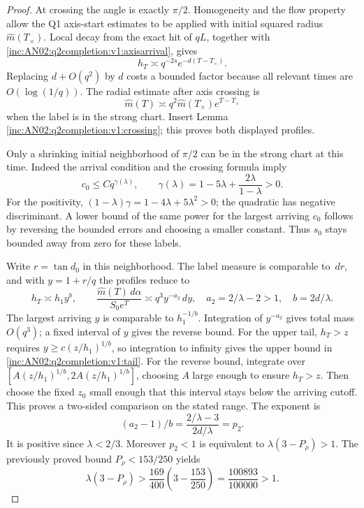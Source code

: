 \documentclass[11pt]{article}
\theoremstyle{remark}\newtheorem{remark}[theorem]{Remark}
\newcommand{\dd}{\,d}\newcommand{\E}{\mathbb E}
\begin{document}
\begin{proof}
At crossing the angle is exactly $\pi/2$. Homogeneity and the flow property allow the Q1 axis-start estimates to be applied with initial squared radius $\widehat m(T_\times)$. Local decay from the exact hit of $qL$, together with \eqref{inc:AN02:q2completion:v1:axisarrival}, gives
\[
 h_T\asymp q^{-2s}e^{-d(T-T_\times)}.
\]
Replacing $d+O(q^2)$ by $d$ costs a bounded factor because all relevant times are $O(\log(1/q))$. The radial estimate after axis crossing is
\[
 \widehat m(T)\asymp q^2\widehat m(T_\times)e^{T-T_\times}
\]
when the label is in the strong chart. Insert Lemma \ref{inc:AN02:q2completion:v1:crossing}; this proves both displayed profiles.

Only a shrinking initial neighborhood of $\pi/2$ can be in the strong chart at this time. Indeed the arrival condition and the crossing formula imply
\[
 c_0\le C q^{\gamma(\lambda)},\qquad
 \gamma(\lambda)=1-5\lambda+\frac{2\lambda}{1-\lambda}>0.
\]
For the positivity, $(1-\lambda)\gamma=1-4\lambda+5\lambda^2>0$; the quadratic has negative discriminant. A lower bound of the same power for the largest arriving $c_0$ follows by reversing the bounded errors and choosing a smaller constant. Thus $s_0$ stays bounded away from zero for these labels.

Write $r=\tan d_0$ in this neighborhood. The label measure is comparable to $\dd r$, and with $y=1+r/q$ the profiles reduce to
\[
 h_T\asymp h_1 y^{b},\qquad
 \frac{\widehat m(T)\dd\alpha}{S_0e^T}\asymp q^3y^{-a_2}\dd y,
 \quad a_2=2/\lambda-2>1,\quad b=2d/\lambda.
\]
The largest arriving $y$ is comparable to $h_1^{-1/b}$. Integration of $y^{-a_2}$ gives total mass $O(q^3)$; a fixed interval of $y$ gives the reverse bound. For the upper tail, $h_T>z$ requires $y\ge c(z/h_1)^{1/b}$, so integration to infinity gives the upper bound in \eqref{inc:AN02:q2completion:v1:tail}. For the reverse bound, integrate over $[A(z/h_1)^{1/b},2A(z/h_1)^{1/b}]$, choosing $A$ large enough to ensure $h_T>z$. Then choose the fixed $z_0$ small enough that this interval stays below the arriving cutoff. This proves a two-sided comparison on the stated range. The exponent is
\[
 (a_2-1)/b=\frac{2/\lambda-3}{2d/\lambda}=p_2.
\]
It is positive since $\lambda<2/3$. Moreover $p_2<1$ is equivalent to $\lambda(3-P_\rho)>1$. The previously proved bound $P_\rho<153/250$ yields
\[
 \lambda(3-P_\rho)>\frac{169}{400}\left(3-\frac{153}{250}\right)
 =\frac{100893}{100000}>1.
\]
\end{proof}
\end{document}
